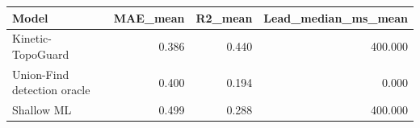 \begin{tabular}{lrrr}
\toprule
Model & MAE\_mean & R2\_mean & Lead\_median\_ms\_mean \\
\midrule
Kinetic-TopoGuard & 0.386 & 0.440 & 400.000 \\
Union-Find detection oracle & 0.400 & 0.194 & 0.000 \\
Shallow ML & 0.499 & 0.288 & 400.000 \\
\bottomrule
\end{tabular}